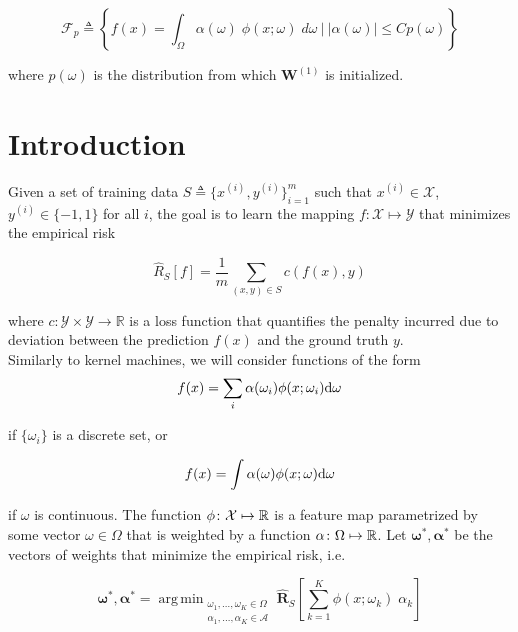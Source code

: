 \documentclass{article}
\DeclareMathOperator*{\argmin}{arg\,min}
\begin{document}
    \begin{equation}
        \mathcal{F}_p \triangleq
        \left\{f(x) = \int_\Omega \alpha(\omega)\;\phi(x; \omega) \;d\omega ~\Big|~
        |\alpha(\omega)| \leq C p(\omega) \right\}
    \end{equation}

    where $p(\omega)$ is the distribution from which $\mathbf{W}^{(1)}$ is initialized.

    \section{Introduction}

    Given a set of training data $S \triangleq \{x^{(i)}, y^{(i)}\}_{i=1}^m$ such that $x^{(i)}\in \mathcal{X}$, $y^{(i)}\in \{-1, 1\}$ for all $i$, the goal is to learn the mapping $f\colon \mathcal{X} \mapsto \mathcal{Y}$ that minimizes the empirical risk

    \begin{equation}
        \hat{R}_S[f] = \frac{1}{m}\sum_{(x, y)\in S} c\left(f(x), y\right)
    \end{equation}

    where $c: \mathcal{Y} \times \mathcal{Y} \to \mathbb{R}$ is a loss function that quantifies the penalty incurred due to deviation between the prediction $f(x)$ and the ground truth $y$.\\

    Similarly to kernel machines, we will consider functions of the form
    \begin{equation}
        f(x) = \sum_i \alpha(\omega_i)\phi(x;\omega_i)\mathrm{d} \omega
    \end{equation}

    if $\{\omega_i\}$ is a discrete set, or

    \begin{equation}
        f(x) = \int \alpha(\omega)\phi(x;\omega)\mathrm{d} \omega
    \end{equation}

    if $\omega$ is continuous. The function $\phi\colon \mathcal{X}\mapsto \mathbb{R}$ is a feature map parametrized by some vector $\omega\in \Omega$ that is weighted by a function $\alpha\colon \Omega\mapsto \mathbb{R}$.  Let $\bm{\omega}^*, \bm{\alpha}^*$ be the vectors of weights that minimize the empirical risk, i.e.

    \begin{equation}
        \bm{\omega}^*, \bm{\alpha}^* =
        \argmin_{\substack{\omega_1, \dots, \omega_K \in \Omega \\ \alpha_1, \dots, \alpha_K \in \mathcal{A}}}
        \hat{\mathbf{R}}_S  \left[\sum_{k=1}^K \phi(x; \omega_k)\;\alpha_k\right]
    \end{equation}
\end{document}
